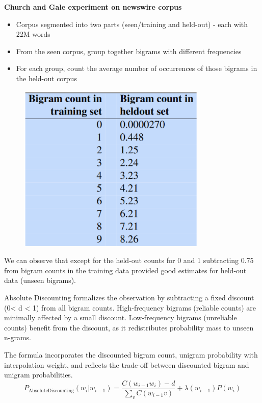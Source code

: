 \documentclass[12pt]{article}
\begin{document}
            \textbf{Church and Gale experiment on newswire corpus}
            \begin{itemize}
                \item Corpus segmented into two parts (seen/training and held-out) - each with 22M words
                \item From the seen corpus, group together bigrams with different frequencies
                \item For each group, count the average number of occurrences of those bigrams in the held-out corpus
            \end{itemize}
            \begin{figure}[h]
                \centering
                \includegraphics[width=0.8\textwidth]{images/abs_disc.png}
            \end{figure}
            
            
            We can observe that except for the held-out counts for 0 and 1 subtracting 0.75 from bigram counts in the training data provided good estimates for held-out data (unseen bigrams).
            
            Absolute Discounting formalizes the observation by subtracting a fixed discount (0< d < 1) from all bigram counts.
            High-frequency bigrams (reliable counts) are minimally affected by a small discount. Low-frequency bigrams (unreliable counts) benefit from the discount, as it redistributes probability mass to unseen n-grams.

            The formula incorporates the discounted bigram count, unigram probability with interpolation weight, and reflects the trade-off between discounted bigram and unigram probabilities.
            \begin{equation}
                P_{\text{AbsoluteDiscounting}}(w_i | w_{i-1}) = \frac{C(w_{i-1}w_i) - d}{\sum_v C(w_{i-1} v)} + \lambda(w_{i-1})P(w_i)
            \end{equation}
\end{document}
